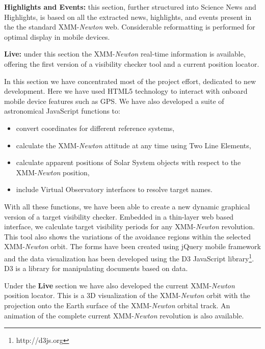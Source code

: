 {\bf Highlights and Events:} this section, further structured into Science News and Highlights, is based on all the extracted news, highlights, and events present in the the standard XMM-{\em Newton} web. Considerable reformatting is performed for optimal display in mobile devices.

{\bf Live:} under this section the XMM-{\em Newton} real-time information is available, offering the first version of a visibility checker tool and a current position locator.

In this section we have concentrated most of the project effort, dedicated to new development. Here we have used HTML5 technology to interact with onboard mobile device features such as GPS. We have also developed a suite of astronomical JavaScript functions to: 
\begin{itemize}
\item convert coordinates for different reference systems,
\item calculate the XMM-{\em Newton} attitude at any time using Two Line Elements,
\item calculate apparent positions of Solar System objects with respect to the XMM-{\em Newton} position,
\item include Virtual Observatory interfaces to resolve target names.
\end{itemize}

With all these functions, we have been able to create a new dynamic graphical version of a target visibility checker. Embedded in a thin-layer web based interface, we calculate target visibility periods for any XMM-{\em Newton} revolution. This tool also shows the variations of the avoidance regions within the selected XMM-{\em Newton} orbit. The forms have been created using jQuery mobile framework and the data visualization has been developed using the D3 JavaScript library\footnote{http://d3js.org}. D3 is a library for manipulating documents based on data. 

Under the {\bf Live} section we have also developed the current XMM-{\em Newton} position locator. This is a 3D visualization of the XMM-{\em Newton} orbit with the projection onto the Earth surface of the XMM-{\em Newton} orbital track. An animation of the complete current XMM-{\em Newton} revolution is also available.

